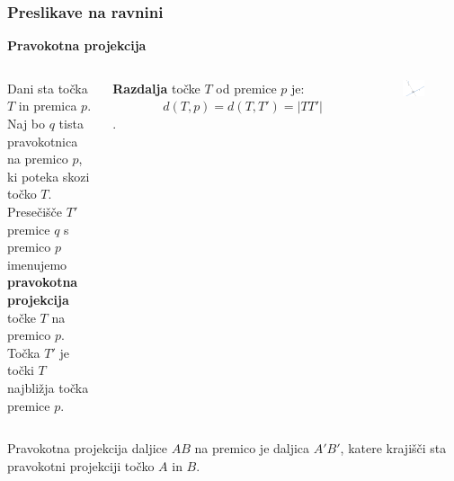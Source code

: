         \begin{frame}
            \frametitle{Preslikave na ravnini}

            \large\textbf{Pravokotna projekcija}
            ~\\

            \normalsize
            \begin{columns}
                    \begin{alertblock}{}
                        Dani sta točka $T$ in premica $p$. Naj bo $q$ tista pravokotnica na premico $p$, ki poteka skozi točko $T$. 
                        Presečišče $T'$ premice $q$ s premico $p$ imenujemo \textbf{pravokotna projekcija} točke $T$ na premico $p$. 
                        Točka $T'$ je točki $T$ najbližja točka premice $p$. \\
                    \end{alertblock}
                    \begin{alertblock}{}
                        \textbf{Razdalja} točke $T$ od premice $p$ je: \\ $\quad \quad \quad \quad d(T,p)=d(T,T')=\left\lvert TT'\right\rvert$. \\
                    \end{alertblock} ~\\

                    \begin{figure}
                    \includegraphics[scale=0.5]{Slike in skice/Pravokotna_projekcija.png}
                    \end{figure}
            \end{columns}

            Pravokotna projekcija daljice $AB$ na premico je daljica $A'B'$, katere krajišči sta pravokotni projekciji točko $A$ in $B$.

            
        \end{frame}

